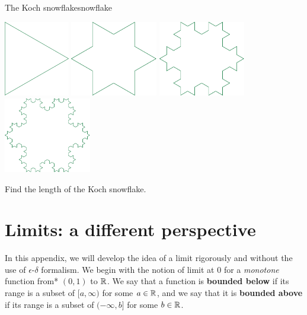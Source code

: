 \documentclass{watsonbook}
\begin{document}
\begin{exercise}{The Koch snowflake}{snowflake}
    \begin{center} 
      \includegraphics[width=2.85cm]{figures/koch0.pdf} \:
      \includegraphics[width=3.8cm]{figures/koch1.pdf} \:
      \includegraphics[width=3.8cm]{figures/koch2.pdf} \:
      \includegraphics[width=3.8cm]{figures/koch3.pdf}
    \end{center}
    
    Find the length of the Koch snowflake. 
  \end{exercise}

  \newpage

  \section{Limits: a different perspective}
\label{sec:limitsappendix}

In this appendix, we will develop the idea of a limit rigorously and
without the use of $\epsilon$-$\delta$ formalism.  We begin with the
notion of limit at 0 for a \textit{monotone} function from* $(0,1)$ to
$\mathbb{R}$. We say that a function is \textbf{bounded below} if its range is
a subset of $[a,\infty)$ for some $a \in \mathbb{R}$, and we say that it is
\textbf{bounded above} if its range is a subset of $(-\infty,b]$ for
some $b \in \mathbb{R}$. 
\end{document}
